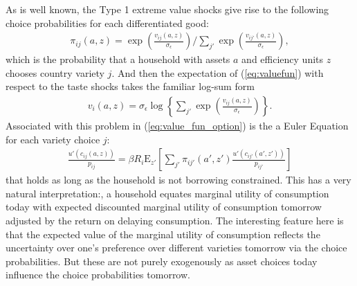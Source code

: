 \documentclass[12pt,pdftex]{article}
\begin{document}
\begin{onehalfspacing}
As is well known, the Type 1 extreme value shocks give rise to the following choice probabilities for each differentiated good:
\begin{align}
\pi_{ij}(a, z) = \exp \left( \frac{ v_{ij}(a, z) }{\sigma_{\epsilon}} \right) \Bigg / \sum_{j'} \exp \left( \frac{ v_{ij'}(a, z) }{\sigma_{\epsilon}} \right), \label{eq:choice-prob}
\end{align}
which is the probability that a household with assets $a$ and efficiency units $z$ chooses country variety $j$. And then the expectation of (\ref{eq:valuefun}) with respect to the taste shocks takes the familiar log-sum form
\begin{align}
v_i(a, z) = \sigma_{\epsilon} \log \left\{ \sum_{j'} \exp \left( \frac{  v_{ij}(a, z)}{\sigma_{\epsilon}} \right) \right\}. \label{eq:log_sum}
\end{align}
Associated with this problem in (\ref{eq:value_fun_option}) is the a Euler Equation for each variety choice $j$:
\begin{align}
\frac{u'(c_{ij}(a, z))}{p_{ij}} = \beta R_{i} \mathrm{E}_{z'} \left[ \sum_{j'} \pi_{ij'}(a', z') \frac{u'(c_{ij'}(a', z'))}{p_{ij'}} \right] 
\label{eq:euler_equation}
\end{align}
that holds as long as the household is not borrowing constrained. This has a very natural interpretation:, a household equates marginal utility of consumption today with expected discounted marginal utility of consumption tomorrow adjusted by the return on delaying consumption. The interesting feature here is that the expected value of the marginal utility of consumption reflects the uncertainty over one's preference over different varieties tomorrow via the choice probabilities. But these are not purely exogenously as asset choices today influence the choice probabilities tomorrow.


\end{onehalfspacing}
\end{document}
